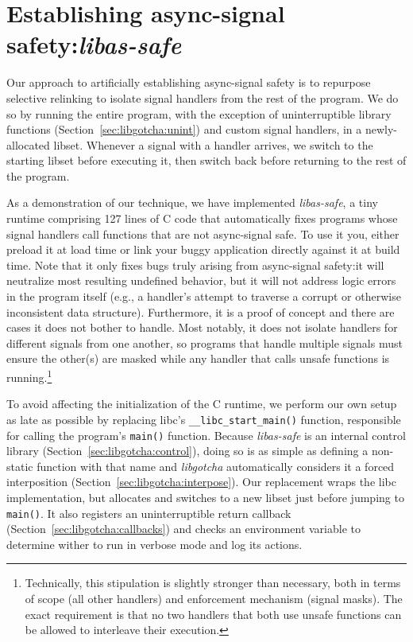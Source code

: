 \section{Establishing async-signal safety:\@ \textit{libas-safe}}

Our approach to artificially establishing async-signal safety is to repurpose
selective relinking to isolate signal handlers from the rest of the program.  We do
so by running the entire program, with the exception of uninterruptible library
functions (Section~\ref{sec:libgotcha:unint}) and custom signal handlers, in a
newly-allocated libset.  Whenever a signal with a handler arrives, we switch to the
starting libset before executing it, then switch back before returning to the rest of
the program.

As a demonstration of our technique, we have implemented \textit{libas-safe}, a tiny
runtime comprising 127 lines of C code that automatically fixes programs whose signal
handlers call functions that are not async-signal safe.  To use it you, either
preload it at load time or link your buggy application directly against it at build
time.  Note that it only fixes bugs truly arising from async-signal safety:\@ it will
neutralize most resulting undefined behavior, but it will not address logic errors in
the program itself (e.g., a handler's attempt to traverse a corrupt or otherwise
inconsistent data structure).  Furthermore, it is a proof of concept and there are
cases it does not bother to handle.  Most notably, it does not isolate handlers for
different signals from one another, so programs that handle multiple signals must
ensure the other(s) are masked while any handler that calls unsafe functions is
running.\footnote{Technically, this stipulation is slightly stronger than necessary,
both in terms of scope (all other handlers) and enforcement mechanism (signal masks).
The exact requirement is that no two handlers that both use unsafe functions can be
allowed to interleave their execution.}

To avoid affecting the initialization of the C runtime, we perform our own setup as
late as possible by replacing libc's \texttt{\_\_libc\_start\_main()} function,
responsible for calling the program's \texttt{main()} function.  Because
\textit{libas-safe} is an internal control library
(Section~\ref{sec:libgotcha:control}), doing so is as simple as defining a
non-static function with that name and \textit{libgotcha} automatically considers it
a forced interposition (Section~\ref{sec:libgotcha:interpose}).  Our replacement
wraps the libc implementation, but allocates and switches to a new libset just before
jumping to \texttt{main()}.  It also registers an uninterruptible return callback
(Section~\ref{sec:libgotcha:callbacks}) and checks an environment variable to
determine wither to run in verbose mode and log its actions.

